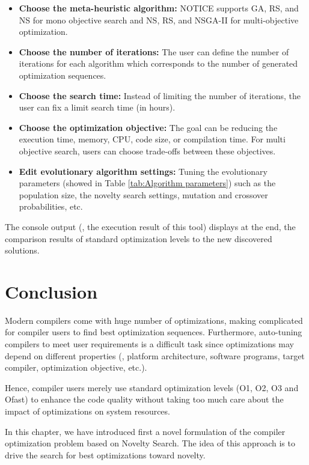 \begin{itemize}
	\item \textbf{Choose the meta-heuristic algorithm:} NOTICE supports GA, RS, and NS for mono objective search and NS, RS, and NSGA-II for multi-objective optimization.
 	
	\item \textbf{Choose the number of iterations:} The user can define the number of iterations for each algorithm which corresponds to the number of generated optimization sequences.

	\item \textbf{Choose the search time:} Instead of limiting the number of iterations, the user can fix a limit search time (in hours). 
	
	\item \textbf{Choose the optimization objective:} The goal can be reducing the execution time, memory, CPU, code size, or compilation time. For multi objective search, users can choose trade-offs between these objectives.
	
	\item \textbf{Edit evolutionary algorithm settings:} Tuning the evolutionary parameters (showed in Table \ref{tab:Algorithm parameters}) such as the population size, the novelty search settings, mutation and crossover probabilities, etc.
\end{itemize} 


The console output (\ie, the execution result of this tool) displays at the end, the comparison results of standard optimization levels to the new discovered solutions.

\section{Conclusion}
\label{notice:conclusion}
Modern compilers come with huge number of optimizations, making complicated for compiler users to find best optimization sequences. Furthermore, auto-tuning compilers to meet user requirements is a difficult task since optimizations may depend on different properties (\eg, platform architecture, software programs, target compiler, optimization objective, etc.).

Hence, compiler users merely use standard optimization levels (O1, O2, O3 and Ofast) to enhance the code quality without taking too much care about the impact of optimizations on system resources.

In this chapter, we have introduced first a novel formulation of the compiler optimization problem based on Novelty Search. The idea of this approach is to drive the search for best optimizations toward novelty. 

